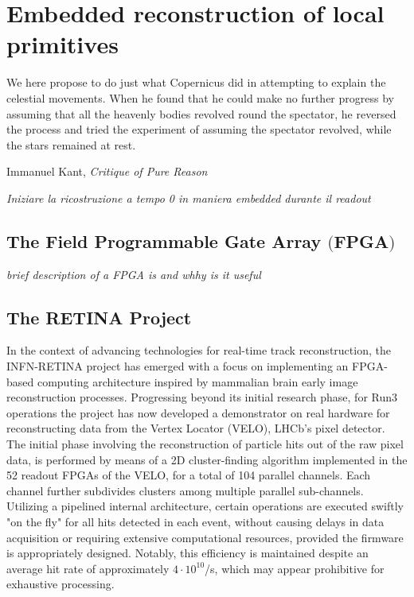 
\chapter{Embedded reconstruction of local primitives}
\label{chp:retina}
\epigraph{We here propose to do just what Copernicus did in attempting to explain the celestial movements. When he found that he could make no further progress by assuming that all the heavenly bodies revolved round the spectator, he reversed the process and tried the experiment of assuming the spectator revolved, while the stars remained at rest.}{Immanuel Kant, \textit{Critique of Pure Reason}}
\textit{Iniziare la ricostruzione a tempo 0 in maniera embedded durante il readout}

\section[The Field Programmable Gate Array]{The Field Programmable Gate Array $\bigl($FPGA$\bigr)$}
\textit{brief description of a FPGA is and whhy is it useful}

\section{The RETINA Project}
In the context of advancing technologies for real-time track reconstruction, the INFN-RETINA project has emerged with a focus on implementing an FPGA-based computing architecture inspired by  mammalian brain early image reconstruction processes. Progressing beyond its initial research phase, for Run3 operations the project has now developed a demonstrator on real hardware for reconstructing data from the Vertex Locator (VELO), LHCb's pixel detector. The initial phase involving the reconstruction of particle hits out of the raw pixel data, is performed by means of a 2D cluster-finding algorithm implemented in the 52 readout FPGAs of the VELO, for a total of 104 parallel channels. Each channel further subdivides clusters among multiple parallel sub-channels. Utilizing a pipelined internal architecture, certain operations are executed swiftly "on the fly" for all hits detected in each event, without causing delays in data acquisition or requiring extensive computational resources, provided the firmware is appropriately designed. Notably, this efficiency is maintained despite an average hit rate of approximately $4 \cdot 10^{10}$/s, which may appear prohibitive for exhaustive processing.\\

